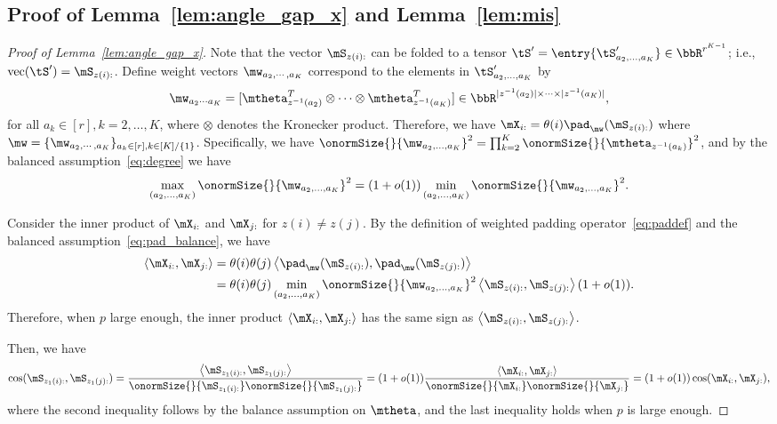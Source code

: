 \documentclass[lettersize,onecolumn,journal]{IEEEtran}
\theoremstyle{definition}
\theoremstyle{definition}
\newcommand{\ang}[1]{\left\langle#1\right\rangle}
\begin{document}
{
\color{blue}

\subsection{Proof of Lemma~\ref{lem:angle_gap_x} and Lemma~\ref{lem:mis}}

\begin{proof}[Proof of Lemma~\ref{lem:angle_gap_x}] 

Note that the vector $\mS_{z(i):}$ can be folded to a tensor $\tS' =\entry{\tS'_{a_2,\ldots,a_K}} \in \bbR^{r^{K-1}}$; i.e., $\text{vec}(\tS') = \mS_{z(i):}$. Define weight vectors $\mw_{a_2, \cdots, a_K}$ correspond to the elements in $\tS'_{a_2,\ldots,a_K}$ by
\begin{equation}
    \mw_{a_2 \cdots a_K} = [ \mtheta_{z^{-1} (a_2)}^T \otimes \cdots \otimes \mtheta_{z^{-1} (a_K)}^T] \in \bbR^{|z^{-1} (a_2)| \times \cdots \times |z^{-1} (a_K)|},
\end{equation}
for all $a_k \in [r], k = 2,\ldots, K$, where $\otimes$ denotes the Kronecker product. Therefore, we have  $\mX_{i:} = \theta(i) \pad_{\mw}(\mS_{z(i):})$ where $\mw = \{ \mw_{a_2, \cdots, a_K}\}_{a_k \in [r], k\in [K]/\{1\}}$. Specifically, we have $\onormSize{}{\mw_{a_2, \ldots, a_K}}^2 = \prod_{k = 2}^K \onormSize{}{ \mtheta_{z^{-1}(a_k)}}^2$, and by the balanced assumption~\eqref{eq:degree} we have 
\begin{equation}\label{eq:pad_balance}
    \max_{(a_2,\ldots, a_K)} \onormSize{}{\mw_{a_2,\ldots, a_K}}^2 = (1 + o(1))  \min_{(a_2,\ldots, a_K)} \onormSize{}{\mw_{a_2,\ldots, a_K}}^2.
\end{equation}

Consider the inner product of $\mX_{i:}$ and $\mX_{j:}$ for $z(i) \neq z(j)$. By the definition of weighted padding operator~\eqref{eq:paddef} and the balanced assumption~\eqref{eq:pad_balance}, we have 
\begin{align}
    \ang{\mX_{i:},\mX_{j:}} &= \theta(i) \theta(j) \ang{ \pad_{\mw}(\mS_{z(i):}), \pad_{\mw}(\mS_{z(j):} )}\\
    &= \theta(i) \theta(j) \min_{(a_2,\ldots, a_K)} \onormSize{}{\mw_{a_2,\ldots, a_K}}^2 \ang{\mS_{z(i):}, \mS_{z(j):}}(1 + o(1)).
\end{align}
Therefore, when $p$ large enough, the inner product $\ang{\mX_{i:},\mX_{j:}} $ has the same sign as $\ang{\mS_{z(i):}, \mS_{z(j):}}$. 

{
\color{blue} 

{
\color{red} Then, we have 
\begin{equation}
    \cos (\mS_{z_1(i):}, \mS_{z_1(j):}) = \frac{ \ang{  \mS_{z_1(i):}, \mS_{z_1(j):} }}{ \onormSize{}{\mS_{z_1(i):}} \onormSize{}{\mS_{z_1(j):}} }  = (1+o(1))\frac{ \ang{  \mX_{i:}, \mX_{j:} }}{ \onormSize{}{ \mX_{i:}} \onormSize{}{ \mX_{j:}} } = (1 + o(1)) \cos(\mX_{i:}, \mX_{j:}),
\end{equation}
where the second inequality follows by the balance assumption on $\mtheta$, and the last inequality holds when $p$ is large enough. 

}}
\end{proof}}
\end{document}
